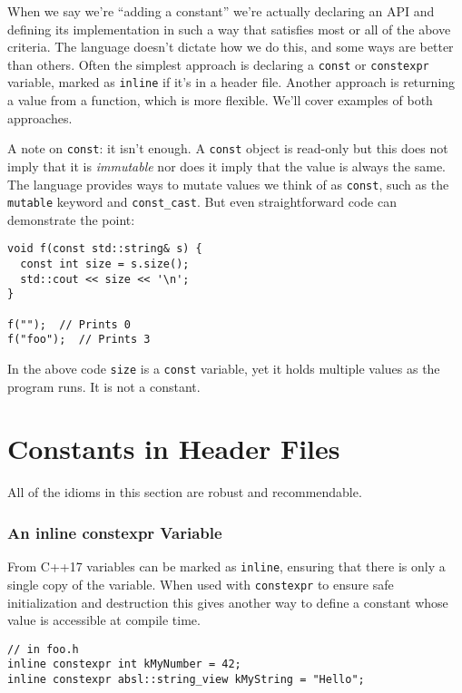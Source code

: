 When we say we’re \enquote{adding a constant} we’re actually declaring an API and defining its implementation in such a way that satisfies most or all of the above criteria. The language doesn’t dictate how we do this, and some ways are better than others. Often the simplest approach is declaring a \texttt{const} or \texttt{constexpr} variable, marked as \texttt{inline} if it’s in a header file. Another approach is returning a value from a function, which is more flexible. We’ll cover examples of both approaches.

A note on \texttt{const}: it isn’t enough. A \texttt{const} object is read-only but this does not imply that it is \emph{immutable} nor does it imply that the value is always the same. The language provides ways to mutate values we think of as \texttt{const}, such as the \texttt{mutable} keyword and \texttt{const_cast}. But even straightforward code can demonstrate the point:
\begin{verbatim}
void f(const std::string& s) {
  const int size = s.size();
  std::cout << size << '\n';
}

f("");  // Prints 0
f("foo");  // Prints 3
\end{verbatim}
In the above code \texttt{size} is a \texttt{const} variable, yet it holds multiple values as the program runs. It is not a constant.

\section{Constants in Header Files}
All of the idioms in this section are robust and recommendable.
\subsubsection{An inline constexpr Variable}
From C++17 variables can be marked as \texttt{inline}, ensuring that there is only a single copy of the variable. When used with \texttt{constexpr} to ensure safe initialization and destruction this gives another way to define a constant whose value is accessible at compile time.
\begin{verbatim}
// in foo.h
inline constexpr int kMyNumber = 42;
inline constexpr absl::string_view kMyString = "Hello";
\end{verbatim}

